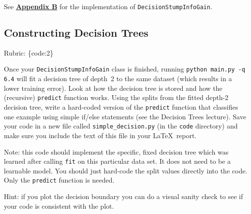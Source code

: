 \documentclass{article}
\def\rubric#1{\gre{Rubric: \{#1\}}}{}
\def\blu#1{{\color{blu}#1}}
\def\gre#1{{\color{gre}#1}}
\begin{document}
See \hyperref[appendix:DecisionStumpInfoGain]{\textbf{Appendix B}} for the implementation of \texttt{DecisionStumpInfoGain}.\\

\subsection{Constructing Decision Trees}
\rubric{code:2}

Once your \texttt{DecisionStumpInfoGain} class is finished, running \texttt{python main.py -q 6.4} will fit
a decision tree of depth~2 to the same dataset (which results in a lower training error).
Look at how the decision tree is stored and how the (recursive) \texttt{predict} function works.
\blu{Using the splits from the fitted depth-2 decision tree, write a hard-coded version of the \texttt{predict}
function that classifies one example using simple if/else statements
(see the Decision Trees lecture).} Save your code in a new file called
\texttt{simple\string_decision.py} (in the \texttt{code} directory) and make sure you include the text of this file in your \LaTeX \, report.

Note: this code should implement the specific, fixed decision tree
which was learned after calling \texttt{fit} on this particular data set. It does not need to be a learnable model.
You should just hard-code the split values directly into the code. Only the \texttt{predict} function is needed.

Hint: if you plot the decision boundary you can do a visual sanity check to see if your code is consistent with the plot. \\

\end{document}
